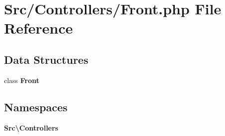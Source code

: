 \section{Src/\+Controllers/\+Front.php File Reference}
\label{_front_8php}
\subsection*{Data Structures}
\begin{DoxyCompactItemize}
\item 
class \textbf{ Front}
\end{DoxyCompactItemize}
\subsection*{Namespaces}
\begin{DoxyCompactItemize}
\item 
 \textbf{ Src\textbackslash{}\+Controllers}
\end{DoxyCompactItemize}
